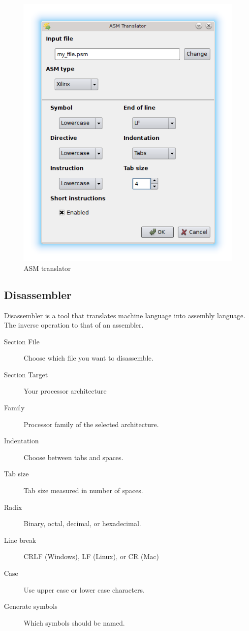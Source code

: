         \begin{figure}[h]
            \centering
            \includegraphics[width=.5\textwidth]{img/ASM_translator.png}
            \caption{ASM translator}
        \end{figure}

    \subsection{Disassembler}
        Disassembler is a tool that translates machine language into assembly language. The inverse
        operation to that of an assembler.

        \begin{description}
            \item[Section File] Choose which file you want to disassemble.
            \item[Section Target] Your processor architecture
            \item[Family] Processor family of the selected architecture.
            \item[Indentation] Choose between tabs and spaces.
            \item[Tab size] Tab size measured in number of spaces.
            \item[Radix] Binary, octal, decimal, or hexadecimal.
            \item[Line break] CRLF (Windows), LF (Linux), or CR (Mac)
            \item[Case] Use upper case or lower case characters.
            \item[Generate symbols] Which symbols should be named.
        \end{description}


